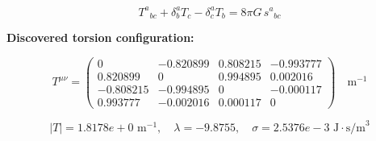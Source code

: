 
\begin{equation}
  T^a{}_{bc} + \delta^a_b T_c - \delta^a_c T_b = 8\pi G \, s^a{}_{bc}
\end{equation}

\textbf{Discovered torsion configuration:}

\begin{equation}
  T^{\mu\nu} = \begin{pmatrix}
    0 & -0.820899 & 0.808215 & -0.993777 \\
    0.820899 & 0 & 0.994895 & 0.002016 \\
    -0.808215 & -0.994895 & 0 & -0.000117 \\
    0.993777 & -0.002016 & 0.000117 & 0
  \end{pmatrix} \quad \text{m}^{-1}
\end{equation}

\begin{equation}
  |T| = 1.8178e+0 \text{ m}^{-1}, \quad
  \lambda = -9.8755, \quad
  \sigma = 2.5376e-3 \text{ J}\cdot\text{s/m}^3
\end{equation}